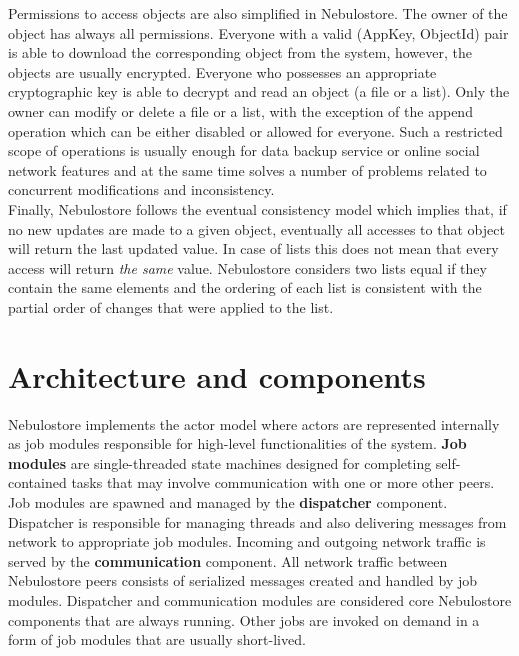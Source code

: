 \documentclass{pracamgren}
\begin{document}
Permissions to access objects are also simplified in Nebulostore. The owner of the object has always all permissions. Everyone with a valid (AppKey, ObjectId) pair is able to download the corresponding object from the system, however, the objects are usually encrypted. Everyone who possesses an appropriate cryptographic key is able to decrypt and read an object (a file or a list). Only the owner can modify or delete a file or a list, with the exception of the append operation which can be either disabled or allowed for everyone. Such a restricted scope of operations is usually enough for data backup service or online social network features and at the same time solves a number of problems related to concurrent modifications and inconsistency.\\

Finally, Nebulostore follows the eventual consistency model \cite{eventually} which implies that, if no new updates are made to a given object, eventually all accesses to that object will return the last updated value. In case of lists this does not mean that every access will return {\it the same} value. Nebulostore considers two lists equal if they contain the same elements and the ordering of each list is consistent with the partial order of changes that were applied to the list.\\

\section{Architecture and components}

Nebulostore implements the actor model where actors are represented internally as job modules responsible for high-level functionalities of the system. {\bf Job modules} are single-threaded state machines designed for completing self-contained tasks that may involve communication with one or more other peers. Job modules are spawned and managed by the {\bf dispatcher} component. Dispatcher is responsible for managing threads and also delivering messages from network to appropriate job modules. Incoming and outgoing network traffic is served by the {\bf communication} component. All network traffic between Nebulostore peers consists of serialized messages created and handled by job modules. Dispatcher and communication modules are considered core Nebulostore components that are always running. Other jobs are invoked on demand in a form of job modules that are usually short-lived.\\
\end{document}
